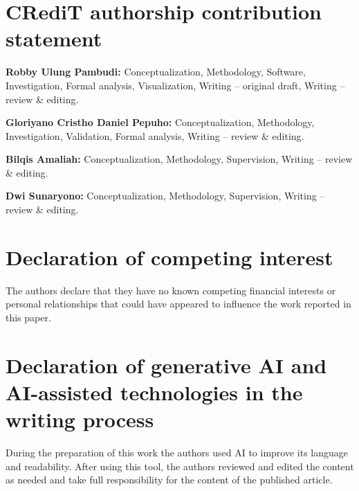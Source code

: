 \documentclass[a4paper,fleqn]{cas-dc}
\begin{document}
\section*{CRediT authorship contribution statement}

\noindent
\textbf{Robby Ulung Pambudi:}
Conceptualization, Methodology, Software, Investigation, Formal analysis,
Visualization, Writing -- original draft, Writing -- review \& editing.

\noindent
\textbf{Gloriyano Cristho Daniel Pepuho:}
Conceptualization, Methodology, Investigation, Validation, Formal analysis,
Writing -- review \& editing.

\noindent
\textbf{Bilqis Amaliah:}
Conceptualization, Methodology, Supervision, Writing -- review \& editing.

\noindent
\textbf{Dwi Sunaryono:}
Conceptualization, Methodology, Supervision, Writing -- review \& editing.

\section*{Declaration of competing interest}

The authors declare that they have no known competing financial interests or
personal relationships that could have appeared to influence the work reported in
this paper.


\section*{Declaration of generative AI and AI-assisted technologies in the writing process}
During the preparation of this work the authors used AI to improve its language and readability. After using this tool, the authors reviewed and edited the content as needed and take full responsibility for the content of the published article.


\FloatBarrier
\appendix
\end{document}
